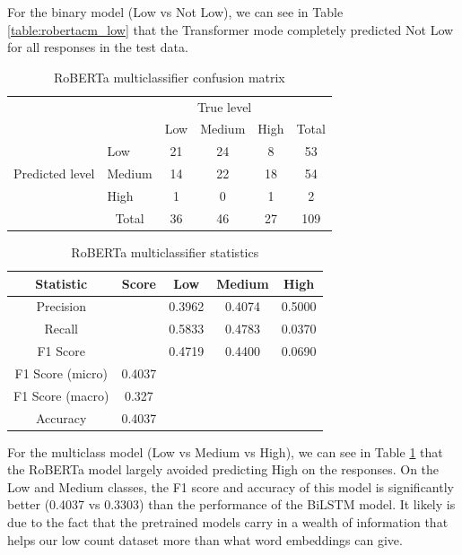 \documentclass[12pt, a4paper]{article}
\begin{document}
For the binary model (Low vs Not Low), we can see in Table \ref{table:robertacm_low} that the Transformer mode completely predicted Not Low for all responses in the test data. 

\begin{table}[ht]
\centering
\begin{tabular}{l|l|c|c|c|c}
\multicolumn{2}{c}{}&\multicolumn{3}{c}{True level}&\\
\cline{3-5}
\multicolumn{2}{c|}{}&Low&Medium&High&\multicolumn{1}{c}{Total}\\
\cline{2-5}
\multirow{3}{*}{Predicted level}& Low & 21 & 24 & 8 & 53\\
\cline{2-5}
& Medium & 14 & 22 & 18 & 54\\
\cline{2-5}
& High & 1 & 0 & 1 & 2\\
\cline{2-5}
\multicolumn{1}{c}{} & \multicolumn{1}{c}{Total} & \multicolumn{1}{c}{36} & \multicolumn{    1}{c}{46} & \multicolumn{    1}{c}{27} & \multicolumn{1}{c}{109}\\
\end{tabular}
\caption{RoBERTa multiclassifier confusion matrix}
\label{table:robertacm}
\end{table}


\begin{table}[ht]
\centering
\begin{tabular}{||c c c c c||} 
 \hline
 Statistic & Score & Low & Medium & High  \\ [0.5ex] 
 \hline\hline
 Precision &  & 0.3962 & 0.4074 & 0.5000 \\ 
 Recall & & 0.5833 & 0.4783  & 0.0370\\
 F1 Score &  & 0.4719 & 0.4400  & 0.0690\\
 F1 Score (micro) & 0.4037 & & & \\
 F1 Score (macro)  & 0.327 & & & \\ 
 Accuracy  & 0.4037 & & & \\ [1ex] 
 \hline
\end{tabular}
\caption{RoBERTa multiclassifier statistics}
\label{table:robertastat}
\end{table}


For the multiclass model (Low vs Medium vs High), we can see in Table \ref{table:robertacm} that the RoBERTa model largely avoided predicting High on the responses. On the Low and Medium classes, the F1 score and accuracy of this model is significantly better (0.4037 vs 0.3303) than the performance of the BiLSTM model. It likely is due to the fact that the pretrained models carry in a wealth of information that helps our low count dataset more than what word embeddings can give.
\end{document}
